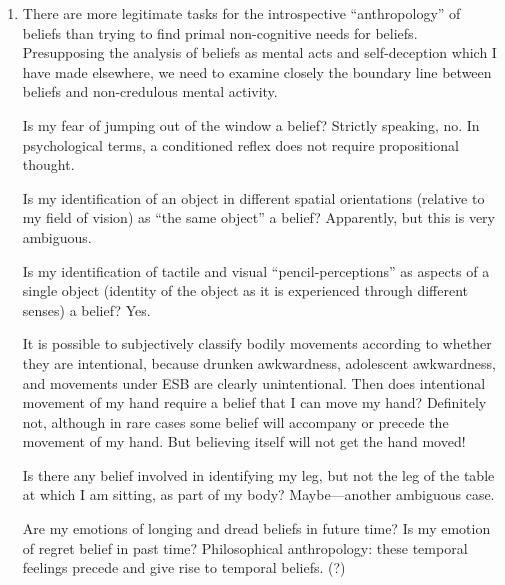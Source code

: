 \begin{enumerate}[label=\textbf{\Alph*.}, wide, nosep, itemsep=1em]
In short, the paradoxes which my philosophy uncovers must remain unexplained and unresolved. 

The other objection to my philosophical anthropology is that its implications are unnecessarily conservative. An explanation of why people do something wrong can become an assertion that it is necessary to do wrong and finally a justification for doing wrong. But just because I tend, for example, to construe my perceptions as confirmations of propositions about phenomena beyond my experience does not mean that I must think in this way. To explain the modern cognitive orientation by philosophical anthropology tends to absolutize it and to conceal its dispensability. 

\item There are more legitimate tasks for the introspective \enquote{anthropology} of beliefs than trying to find primal non-cognitive needs for beliefs. Presupposing the analysis of beliefs as mental acts and self-deception which I have made elsewhere, we need to examine closely the boundary line between beliefs and non-credulous mental activity. 

Is my fear of jumping out of the window a belief? Strictly speaking, no. In psychological terms, a conditioned reflex does not require propositional thought. 

Is my identification of an object in different spatial orientations (relative to my field of vision) as \enquote{the same object} a belief? Apparently, but this is very ambiguous. 

Is my identification of tactile and visual \enquote{pencil-perceptions} as aspects of a single object (identity of the object as it is experienced through different senses) a belief? Yes. 

It is possible to subjectively classify bodily movements according to whe\-ther they are intentional, because drunken awkwardness, adolescent awkwardness, and movements under ESB are clearly unintentional. Then does intentional movement of my hand require a belief that I can move my hand? Definitely not, although in rare cases some belief will accompany or precede the movement of my hand. But believing itself will not get the hand moved! 

Is there any belief involved in identifying my leg, but not the leg of the table at which I am sitting, as part of my body? Maybe---another ambiguous case.

Are my emotions of longing and dread beliefs in future time? Is my emotion of regret belief in past time? Philosophical anthropology: these temporal feelings precede and give rise to temporal beliefs. (?) 


\end{enumerate}
